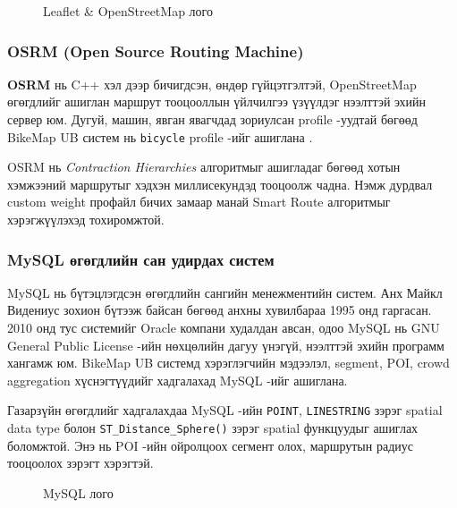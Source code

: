 \begin{figure}[H]
    \centering
    \caption{Leaflet \& OpenStreetMap лого}
    \label{fig:leaflet-logo}
\end{figure}

\subsubsection{OSRM (Open Source Routing Machine)}
\par
\textbf{OSRM} нь C++ хэл дээр бичигдсэн, өндөр гүйцэтгэлтэй, OpenStreetMap өгөгдлийг ашиглан маршрут тооцооллын үйлчилгээ үзүүлдэг нээлттэй эхийн сервер юм. Дугуй, машин, явган явагчдад зориулсан profile -уудтай бөгөөд BikeMap UB систем нь \texttt{bicycle} profile -ийг ашиглана \cite{osrm}.

\par OSRM нь \textit{Contraction Hierarchies} алгоритмыг ашигладаг бөгөөд хотын хэмжээний маршрутыг хэдхэн миллисекундэд тооцоолж чадна. Нэмж дурдвал custom weight профайл бичих замаар манай Smart Route алгоритмыг хэрэгжүүлэхэд тохиромжтой.

\subsubsection{MySQL өгөгдлийн сан удирдах систем}
\par
MySQL нь бүтэцлэгдсэн өгөгдлийн сангийн менежментийн систем. Анх Майкл Видениус зохион бүтээж байсан бөгөөд анхны хувилбараа 1995 онд гаргасан. 2010 онд тус системийг Oracle компани худалдан авсан, одоо MySQL нь GNU General Public License -ийн нөхцөлийн дагуу үнэгүй, нээлттэй эхийн программ хангамж юм. BikeMap UB системд хэрэглэгчийн мэдээлэл, segment, POI, crowd aggregation хүснэгтүүдийг хадгалахад MySQL -ийг ашиглана.

\par Газарзүйн өгөгдлийг хадгалахдаа MySQL -ийн \texttt{POINT}, \texttt{LINESTRING} зэрэг spatial data type болон \texttt{ST\_Distance\_Sphere()} зэрэг spatial функцуудыг ашиглах боломжтой. Энэ нь POI -ийн ойролцоох сегмент олох, маршрутын радиус тооцоолох зэрэгт хэрэгтэй.

\begin{figure}[H]
    \centering
    \caption{MySQL лого}
    \label{fig:mysql-logo}
\end{figure}

